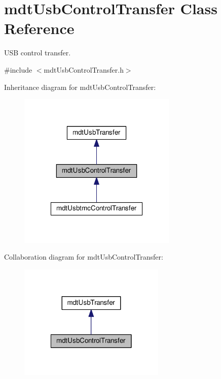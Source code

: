 \hypertarget{classmdt_usb_control_transfer}{\section{mdt\-Usb\-Control\-Transfer Class Reference}
\label{classmdt_usb_control_transfer}
}


U\-S\-B control transfer.  




{\ttfamily \#include $<$mdt\-Usb\-Control\-Transfer.\-h$>$}



Inheritance diagram for mdt\-Usb\-Control\-Transfer\-:\nopagebreak
\begin{figure}[H]
\begin{center}
\leavevmode
\includegraphics[width=214pt]{classmdt_usb_control_transfer__inherit__graph}
\end{center}
\end{figure}


Collaboration diagram for mdt\-Usb\-Control\-Transfer\-:\nopagebreak
\begin{figure}[H]
\begin{center}
\leavevmode
\includegraphics[width=198pt]{classmdt_usb_control_transfer__coll__graph}
\end{center}
\end{figure}
